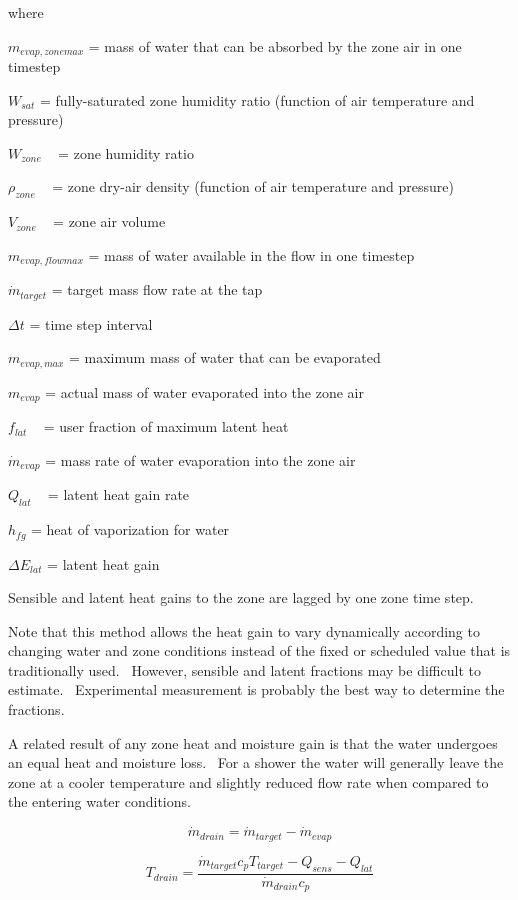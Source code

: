 where

\({m_{evap,zonemax}}\) = mass of water that can be absorbed by the zone air in one timestep

\({W_{sat}}\) = fully-saturated zone humidity ratio (function of air temperature and pressure)

\({W_{zone}}\) ~ = zone humidity ratio

\({\rho_{zone}}\) ~ = zone dry-air density (function of air temperature and pressure)

\({V_{zone}}\) ~ = zone air volume

\({m_{evap,flowmax}}\) = mass of water available in the flow in one timestep

\({\dot m_{target}}\) = target mass flow rate at the tap

\(\Delta t\) = time step interval

\({m_{evap,max}}\) = maximum mass of water that can be evaporated

\({m_{evap}}\) = actual mass of water evaporated into the zone air

\({f_{lat}}\) ~ = user fraction of maximum latent heat

\({\dot m_{evap}}\) = mass rate of water evaporation into the zone air

\({Q_{lat}}\) ~ = latent heat gain rate

\({h_{fg}}\) = heat of vaporization for water

\(\Delta {E_{lat}}\) = latent heat gain

Sensible and latent heat gains to the zone are lagged by one zone time step.

Note that this method allows the heat gain to vary dynamically according to changing water and zone conditions instead of the fixed or scheduled value that is traditionally used.~ However, sensible and latent fractions may be difficult to estimate.~ Experimental measurement is probably the best way to determine the fractions.

A related result of any zone heat and moisture gain is that the water undergoes an equal heat and moisture loss.~ For a shower the water will generally leave the zone at a cooler temperature and slightly reduced flow rate when compared to the entering water conditions.

\begin{equation}
{\dot m_{drain}} = {\dot m_{target}} - {\dot m_{evap}}
\end{equation}

\begin{equation}
{T_{drain}} = \frac{{{{\dot m}_{target}}{c_p}{T_{target}} - {Q_{sens}} - {Q_{lat}}}}{{{{\dot m}_{drain}}{c_p}}}
\end{equation}

